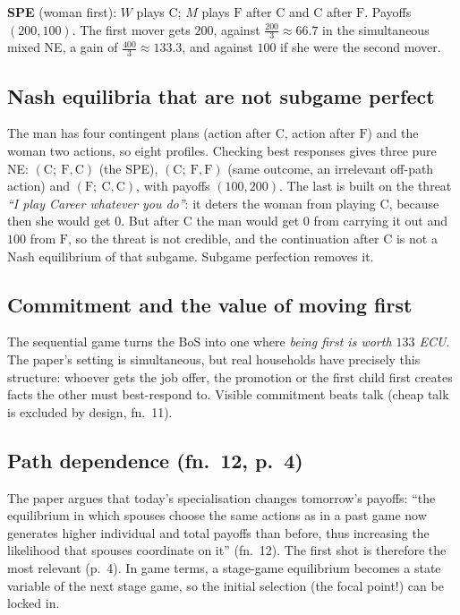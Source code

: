 \documentclass[11pt,a4paper]{article}
\newcommand{\answer}[1]{\begin{tcolorbox}[colback=ans!5,colframe=ans,boxrule=0.6pt,
  left=5pt,right=5pt,top=3pt,bottom=3pt]#1\end{tcolorbox}}
\newcommand{\C}{\mathrm{C}}
\newcommand{\Fm}{\mathrm{F}}
\begin{document}
\answer{\textbf{SPE} (woman first): $W$ plays $\C$; $M$ plays $\Fm$ after $\C$ and $\C$ after $\Fm$. Payoffs
$(200,100)$. The first mover gets $200$, against $\tfrac{200}{3}\approx66.7$ in the simultaneous
mixed NE, a gain of $\tfrac{400}{3}\approx133.3$, and against $100$ if she were the second mover.}

\subsection{Nash equilibria that are not subgame perfect}
The man has four contingent plans (action after $\C$, action after $\Fm$) and the woman two
actions, so eight profiles. Checking best responses gives three pure NE:
$(\C;\ \Fm,\C)$ (the SPE), $(\C;\ \Fm,\Fm)$ (same outcome, an irrelevant off-path action) and
$(\Fm;\ \C,\C)$, with payoffs $(100,200)$. The last is built on the threat \emph{``I play Career
whatever you do''}: it deters the woman from playing $\C$, because then she would get $0$. But after
$\C$ the man would get $0$ from carrying it out and $100$ from $\Fm$, so the threat is not credible,
and the continuation after $\C$ is not a Nash equilibrium of that subgame. Subgame perfection removes it.

\subsection{Commitment and the value of moving first}
The sequential game turns the BoS into one where \emph{being first is worth $133$ ECU}. The
paper's setting is simultaneous, but real households have precisely this structure: whoever gets the
job offer, the promotion or the first child first creates facts the other must best-respond to.
Visible commitment beats talk (cheap talk is excluded by design, fn.~11).

\subsection{Path dependence (fn.~12, p.~4)}
The paper argues that today's specialisation changes tomorrow's payoffs: ``the equilibrium in which
spouses choose the same actions as in a past game now generates higher individual and total
payoffs than before, thus increasing the likelihood that spouses coordinate on it'' (fn.~12).
The first shot is therefore the most relevant (p.~4). In game terms, a stage-game equilibrium
becomes a state variable of the next stage game, so the initial selection (the focal point!) can be
locked in.
\end{document}
